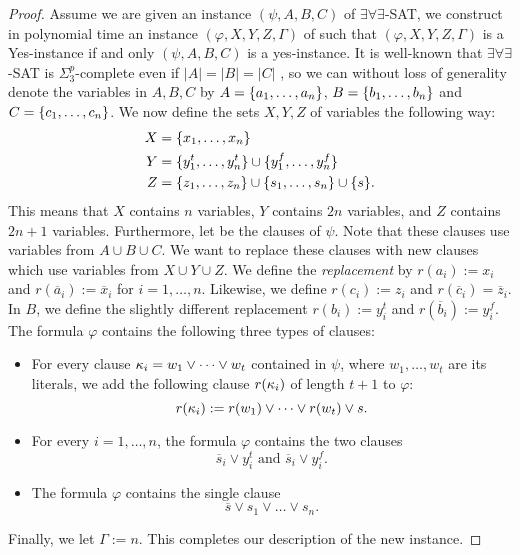 \begin{proof}
Assume we are given an instance $(\psi,A,B,C)$ of $\exists\forall\exists$-SAT, we construct in polynomial time an instance $(\varphi,X,Y,Z,\Gamma)$ of {\radj} such that $(\varphi,X,Y,Z,\Gamma)$ is a Yes-instance if and only  $(\psi,A,B,C)$ is a yes-instance. 
It is well-known \cite{schaefer2002completeness} that $\exists\forall\exists$-SAT is $\Sigma_3^p$-complete even if $|A| = |B| = |C|$ , so we can without loss of generality denote the variables in $A,B,C$ by $A = \{ a_1, \ldots, a_n \}$, $B = \{ b_1, \ldots, b_n \}$ and $C = \{ c_1, \ldots, c_n \}$. 
We now define the sets $X,Y,Z$ of variables the following way:
\begin{align*}
X &= \{ x_1, \ldots, x_n \}\\
Y &= \{ y^t_1, \ldots, y^t_n \} \cup \{ y^f_1, \ldots, y^f_n \}\\
Z &= \{ z_1, \ldots, z_n \} \cup \{ s_1, \ldots, s_n \} \cup \{ s \}.
\end{align*}
This means that $X$ contains $n$ variables, $Y$ contains $2n$ variables, and $Z$ contains $2n+1$ variables. 
Furthermore, let  be the clauses of $\psi$.
Note that these clauses use variables from $A \cup B \cup C$. 
We want to replace these clauses with new clauses which use variables from $X \cup Y \cup Z$. 
We define the \emph{replacement}  by $r(a_i) := x_i$ and $r(\overline a_i) := \overline x_i$ for $i=1,\dots,n$. 
Likewise, we define $r(c_i) := z_i$ and $r(\overline c_i) = \overline z_i$. 
In $B$, we define the slightly different replacement $r(b_i) := y^t_i$ and $r(\overline b_i) := y^f_i$. 
The formula $\varphi$ contains the following three types of clauses: 
\begin{itemize}
\item For every clause $\kappa_i = w_1 \lor \dots \lor w_t$ contained in $\psi$, where $w_1 , \dots, w_t$ are its literals, we add the following clause $r(\kappa_i)$ of length $t+1$ to $\varphi$:
\begin{equation}
r(\kappa_i) := r(w_1) \lor \dots \lor r(w_t) \lor s. \label{clauses1}
\end{equation}
\item For every $i=1,\dots,n$, the formula $\varphi$ contains the two clauses
\begin{equation}
\overline s_i \lor y^t_i \text{ and } \overline s_i \lor y^f_i. \label{clauses2}
\end{equation}
\item The formula $\varphi$ contains the single clause 
\begin{equation}
\overline s \lor s_1 \lor \dots \lor s_n. \label{clauses3}
\end{equation}
\end{itemize}
Finally, we let $\Gamma :=  n$. This completes our description of the new instance. 


\end{proof}
